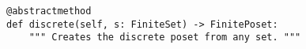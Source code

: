 \par\begin{minipage}{60ex}
\begin{verbatim}
@abstractmethod
def discrete(self, s: FiniteSet) -> FinitePoset:
    """ Creates the discrete poset from any set. """
\end{verbatim}
\end{minipage}\par